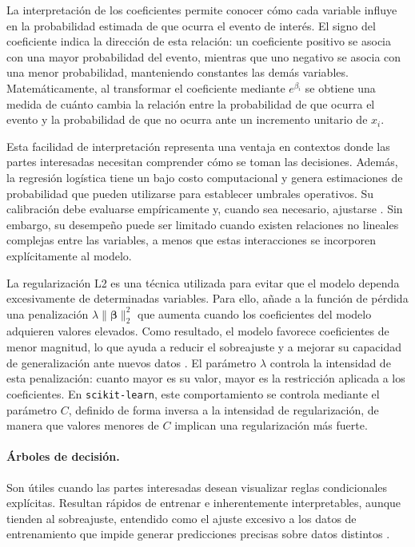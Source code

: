 La interpretación de los coeficientes permite conocer cómo cada variable influye en la probabilidad estimada de que ocurra el evento de interés. El signo del coeficiente indica la dirección de esta relación: un coeficiente positivo se asocia con una mayor probabilidad del evento, mientras que uno negativo se asocia con una menor probabilidad, manteniendo constantes las demás variables. Matemáticamente, al transformar el coeficiente mediante $e^{\beta_i}$ se obtiene una medida de cuánto cambia la relación entre la probabilidad de que ocurra el evento y la probabilidad de que no ocurra ante un incremento unitario de $x_i$.

Esta facilidad de interpretación representa una ventaja en contextos donde las partes interesadas necesitan comprender cómo se toman las decisiones. Además, la regresión logística tiene un bajo costo computacional y genera estimaciones de probabilidad que pueden utilizarse para establecer umbrales operativos. Su calibración debe evaluarse empíricamente y, cuando sea necesario, ajustarse \cite{niculescumizil2005predicting}. Sin embargo, su desempeño puede ser limitado cuando existen relaciones no lineales complejas entre las variables, a menos que estas interacciones se incorporen explícitamente al modelo.

La regularización L2 es una técnica utilizada para evitar que el modelo dependa excesivamente de determinadas variables. Para ello, añade a la función de pérdida una penalización $\lambda\|\boldsymbol{\beta}\|_2^2$ que aumenta cuando los coeficientes del modelo adquieren valores elevados. Como resultado, el modelo favorece coeficientes de menor magnitud, lo que ayuda a reducir el sobreajuste y a mejorar su capacidad de generalización ante nuevos datos \cite{hastie2009elements, james2021introduction}. El parámetro $\lambda$ controla la intensidad de esta penalización: cuanto mayor es su valor, mayor es la restricción aplicada a los coeficientes. En \texttt{scikit-learn}, este comportamiento se controla mediante el parámetro $C$, definido de forma inversa a la intensidad de regularización, de manera que valores menores de $C$ implican una regularización más fuerte.

\paragraph{Árboles de decisión.} Son útiles cuando las partes interesadas desean
visualizar reglas condicionales explícitas. Resultan rápidos de entrenar e
inherentemente interpretables, aunque tienden al sobreajuste, entendido como el
ajuste excesivo a los datos de entrenamiento que impide generar predicciones
precisas sobre datos distintos \cite{ibm_overfitting}.


